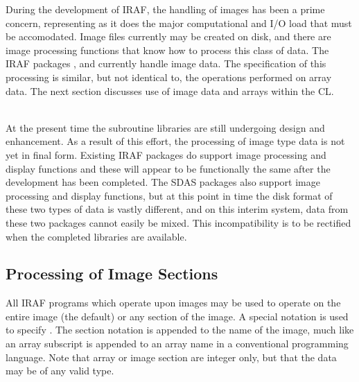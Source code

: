 During the development of IRAF, the handling of images has
been a prime concern, representing as it does the major computational
and I/O load that must be accomodated. Image files currently
may be created on disk, and there are image processing functions that 
know how to process this class of data. The IRAF packages 
, and  currently 
handle image data.
The specification of this processing is similar, but
not identical to, the operations performed on array data.
The next section discusses use of image data and arrays within the CL.

 \\
At the present time the  subroutine libraries
are still undergoing design and enhancement.  As a result of this effort,
the processing of image type data is not yet in final form.  Existing IRAF
packages do support image processing and display
functions and these will appear to be functionally the same after the
development has been completed.  The SDAS packages also support image
processing and display functions, but at this point in time the disk 
format of these two types of data is vastly different, 
and on this interim system, data from these two packages
cannot easily be mixed.  This incompatibility is to be rectified when
the completed  libraries are available.

\subsection{Processing of Image Sections}

All IRAF programs which operate upon images may be used to operate on
the entire image (the default) or any section of the image.
A special notation is used to specify .  The section
notation is appended to the name of the image, much like an
array subscript is appended to an array name in a conventional programming
language. Note that array or image section  
are integer only, but that the data may be of any valid type.

